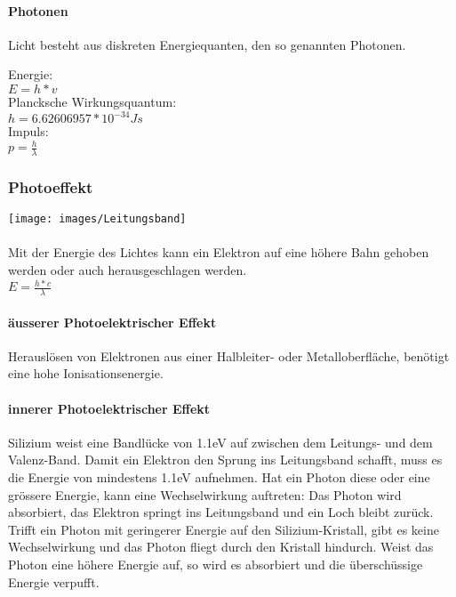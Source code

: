 \paragraph {Photonen}
Licht besteht aus diskreten Energiequanten, den so genannten Photonen.
\begin{multicols}{3}
Energie: \\ $E = h * v$ \\
Plancksche Wirkungsquantum: \\ $h = 6.62606957 * 10^{-34} Js$ \\
Impuls: \\ $p = \frac {h}{\lambda}$ 
\end{multicols}

\subsubsection {Photoeffekt}
\begin{multicols}{4}
\texttt{[image: images/Leitungsband]} \\ \columnbreak 
\ \\ \vfill \columnbreak 
Mit der Energie des Lichtes kann ein Elektron auf eine höhere Bahn gehoben werden oder auch herausgeschlagen werden. \\ 
$E = \frac{h * c}{\lambda}$
\end{multicols}

\paragraph{äusserer Photoelektrischer Effekt}
Herauslösen von Elektronen aus einer Halbleiter- oder Metalloberfläche, benötigt eine hohe Ionisationsenergie.

\paragraph{innerer Photoelektrischer Effekt}
Silizium weist eine Bandlücke von 1.1eV auf zwischen dem Leitungs- und dem Valenz-Band. Damit ein Elektron den Sprung ins Leitungsband schafft, muss es die Energie von mindestens 1.1eV aufnehmen. Hat ein Photon diese oder eine grössere Energie, kann eine Wechselwirkung auftreten: Das Photon wird absorbiert, das Elektron springt ins Leitungsband und ein Loch bleibt zurück. Trifft ein Photon mit geringerer Energie auf den Silizium-Kristall, gibt es keine Wechselwirkung und das Photon fliegt durch den Kristall hindurch. Weist das Photon eine höhere Energie auf, so wird es absorbiert und die überschüssige Energie verpufft.

